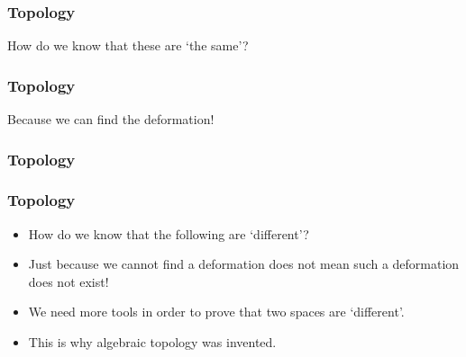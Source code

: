 \begin{frame}
\frametitle{Topology}
How do we know that these are `the same'?

\end{frame}

\begin{frame}
\frametitle{Topology}
Because we can find the deformation!
\frametitle{Topology}
\end{frame}



\begin{frame}
\frametitle{Topology}
\begin{itemize}
\item<1-> How do we know that the following are `different'?
\end{itemize}
\begin{itemize}
\item<2-> Just because we cannot find a deformation does not mean such a deformation does not exist!
\item<3-> We need more tools in order to prove that two spaces are `different'.
\item<4-> This is why algebraic topology was invented.
\end{itemize}
\end{frame}